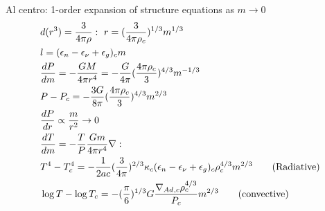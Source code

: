 \begin{frame}[fragile]{Al centro: 1-order expansion of structure equations as $m\to0$}
	\begin{align*}
	&d(r^3)=\frac{3}{4\pi\rho}:\ r=(\frac{3}{4\pi\rho_c})^{1/3}m^{1/3}\\
	&l=(\epsilon_n-\epsilon_{\nu}+\epsilon_g)_cm\\
	&\TDy{m}{P}=-\frac{GM}{4\pi r^4}=-\frac{G}{4\pi}(\frac{4\pi\rho_c}{3})^{4/3}m^{-1/3}\\
	&P-P_c=-\frac{3G}{8\pi}(\frac{4\pi\rho_c}{3})^{4/3}m^{2/3}\\
	&\TDy{r}{P}\propto\frac{m}{r^2}\to0\\
	&\TDy{m}{T}=-\frac{T}{P}\frac{Gm}{4\pi r^4}\nabla:\\
	&T^4-T_c^4=-\frac{1}{2ac}(\frac{3}{4\pi})^{2/3}\kappa_c(\epsilon_n-\epsilon_{\nu}+\epsilon_g)_c\rho_c^{4/3}m^{2/3}\tag{Radiative}\\
	&\log{T}-\log{T_c}=-(\frac{\pi}{6})^{1/3}G\frac{\nad{}_{,c}\rho_c^{4/3}}{P_c}m^{2/3}\tag{convective}
	\end{align*}
\end{frame}

